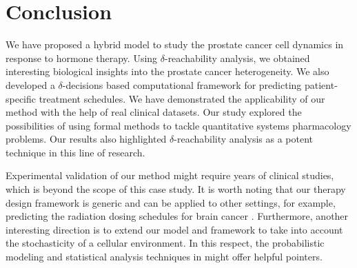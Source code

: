 \section{Conclusion}
\label{sec:Conclusion}

We have proposed a hybrid model to study the prostate cancer cell dynamics in response to hormone therapy. Using $\delta$-reachability analysis, we obtained interesting biological insights into the prostate cancer heterogeneity. We also developed a $\delta$-decisions based computational framework for predicting patient-specific treatment schedules. We have demonstrated the applicability of our method with the help of real clinical datasets. Our study explored the possibilities of using formal methods to tackle quantitative systems pharmacology problems. Our results also highlighted $\delta$-reachability analysis as a potent technique in this line of research. 

Experimental validation of our method might require years of clinical studies, which is beyond the scope of this case study. It is worth noting that our therapy design framework is generic and can be applied to other settings, for example, predicting the radiation dosing schedules for brain cancer \cite{leder14}. Furthermore, another interesting direction is to extend our model and framework to take into account the stochasticity of a cellular environment. In this respect, the probabilistic modeling and statistical analysis techniques in \cite{liu11,liu13,liu12bioinfo} might offer helpful pointers.
